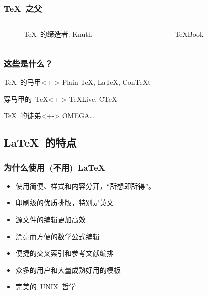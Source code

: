 \begin{frame}
    \frametitle{\TeX~之父}
    \begin{columns}[t]
	\begin{column}{5cm}
		\begin{figure}[htb]
		    \begin{center}
		    \end{center}
		    \caption{\TeX~的缔造者: Knuth}
		    \label{fig:knuth}
		\end{figure}
	\end{column}
	\begin{column}{5cm}
		\begin{figure}[htb]
		    \begin{center}
		    \end{center}
		    \caption{\TeX{}Book}
		    \label{fig:texbook}
		\end{figure}
	\end{column}
    \end{columns}
\end{frame}

\begin{frame}
    \frametitle{这些是什么？}
    \begin{block}{\TeX~的马甲}<+->
	Plain \TeX, \LaTeX, Con\TeX{}t
    \end{block}
    \begin{block}{穿马甲的~\TeX}<+->
	TeXLive, CTeX
    \end{block}
    \begin{block}{\TeX~的徒弟}<+->
	OMEGA\dots
    \end{block}
\end{frame}

\subsection{\LaTeX~的特点}

\begin{frame}
    \frametitle{为什么使用~(不用)~\LaTeX}
    \begin{itemize}
	\item<+-| alert@+> 使用简便、样式和内容分开，“所想即所得”。
	\item<+-| alert@+> 印刷级的优质排版，特别是英文
	\item<+-| alert@+> 源文件的编辑更加高效
	\item<+-| alert@+> 漂亮而方便的数学公式编辑
	\item<+-| alert@+> 便捷的交叉索引和参考文献编排
	\item<+-| alert@+> 众多的用户和大量成熟好用的模板
	\item<+-| alert@+> 完美的~UNIX~哲学
    \end{itemize}
\end{frame}


